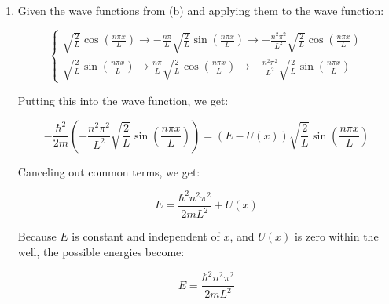 \begin{enumerate}
\begin{enumerate}
        When $n$ is odd:

        $$\int_{-\frac{L}{2}}^{\frac{L}{2}}|B\sin\left( \frac{2\pi x}{L} \right)|^2\,dx=1\Rightarrow b=\sqrt{\frac{L}{2}}$$

        When $n$ is even:

        $$\int_{-\frac{L}{2}}^{\frac{L}{2}}|A\cos\left( \frac{\pi x}{L} \right)|^2\,dx=1\Rightarrow A=\sqrt{\frac{L}{2}}$$

        Thus, the equation becomes:

        $$\left\{\begin{array}{l r} \sqrt{\frac{2}{L}}\cos\left( \frac{n\pi x}{L} \right), & \text{for } n \text{ odd}\\ \sqrt{\frac{2}{L}}\sin\left( \frac{n\pi x}{L} \right), & \text{for } n \text{ even}\\ \end{array}$$

      \item Given the wave functions from (b) and applying them to the wave function:

        $$\left\{\begin{array}{l} \sqrt{\frac{2}{L}}\cos\left( \frac{n\pi x}{L} \right)\rightarrow-\frac{n\pi}{L}\sqrt{\frac{2}{L}}\sin\left( \frac{n\pi x}{L} \right)\rightarrow-\frac{n^2\pi^2}{L^2}\sqrt{\frac{2}{L}}\cos\left( \frac{n\pi x}{L} \right)\\ \sqrt{\frac{2}{L}}\sin\left( \frac{n\pi x}{L} \right)\rightarrow\frac{n\pi}{L}\sqrt{\frac{2}{L}}\cos\left( \frac{n\pi x}{L} \right)\rightarrow-\frac{n^2\pi^2}{L^2}\sqrt{\frac{2}{L}}\sin\left( \frac{n\pi x}{L} \right) \end{array}$$

          Putting this into the wave function, we get:

          $$-\frac{\hbar^2}{2m}\left( -\frac{n^2\pi^2}{L^2}\sqrt{\frac{2}{L}}\sin\left( \frac{n\pi x}{L} \right) \right)=(E-U(x))\sqrt{\frac{2}{L}}\sin\left( \frac{n\pi x}{L} \right)$$

          Canceling out common terms, we get:

          $$E=\frac{\hbar^2n^2\pi^2}{2mL^2}+U(x)$$

          Because $E$ is constant and independent of $x$, and $U(x)$ is zero within the well, the possible energies become:

          $$E=\frac{\hbar^2n^2\pi^2}{2mL^2}$$

    \end{enumerate}


\end{enumerate}
